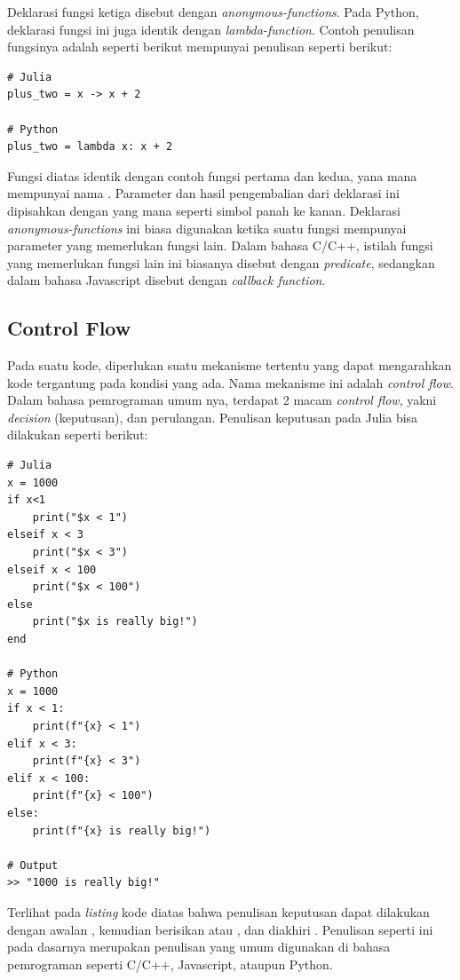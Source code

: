 Deklarasi fungsi ketiga disebut dengan \emph{anonymous-functions}. Pada Python,
deklarasi fungsi ini juga identik dengan \emph{lambda-function}. Contoh
penulisan fungsinya adalah seperti berikut mempunyai penulisan seperti berikut:

\begin{lstlisting}
# Julia
plus_two = x -> x + 2

# Python
plus_two = lambda x: x + 2
\end{lstlisting}

\noindent
Fungsi diatas identik dengan contoh fungsi pertama dan kedua, yana mana
mempunyai nama . Parameter dan hasil pengembalian dari deklarasi
ini dipisahkan dengan \cw{->} yang mana seperti simbol panah ke kanan. Deklarasi
\emph{anonymous-functions} ini biasa digunakan ketika suatu fungsi mempunyai parameter
yang memerlukan fungsi lain. Dalam bahasa C/C++, istilah fungsi yang memerlukan fungsi
lain ini biasanya disebut dengan \emph{predicate}, sedangkan dalam bahasa Javascript
disebut dengan \emph{callback function}.

\subsection{Control Flow}

Pada suatu kode, diperlukan suatu mekanisme tertentu yang dapat mengarahkan
kode tergantung pada kondisi yang ada. Nama mekanisme ini adalah \emph{control
  flow}. Dalam bahasa pemrograman umum nya, terdapat 2 macam \emph{control flow},
yakni \emph{decision} (keputusan), dan perulangan. Penulisan keputusan pada
Julia bisa dilakukan seperti berikut:

\begin{lstlisting}
# Julia
x = 1000
if x<1
    print("$x < 1")
elseif x < 3
    print("$x < 3")
elseif x < 100
    print("$x < 100")
else
    print("$x is really big!")
end

# Python
x = 1000
if x < 1:
    print(f"{x} < 1")
elif x < 3:
    print(f"{x} < 3")
elif x < 100:
    print(f"{x} < 100")
else:
    print(f"{x} is really big!")

# Output
>> "1000 is really big!"
\end{lstlisting}

\noindent
Terlihat pada \emph{listing} kode diatas bahwa penulisan keputusan dapat
dilakukan dengan awalan , kemudian berisikan  atau , dan
diakhiri . Penulisan seperti ini pada dasarnya merupakan penulisan yang umum
digunakan di bahasa pemrograman seperti C/C++, Javascript, ataupun Python.

